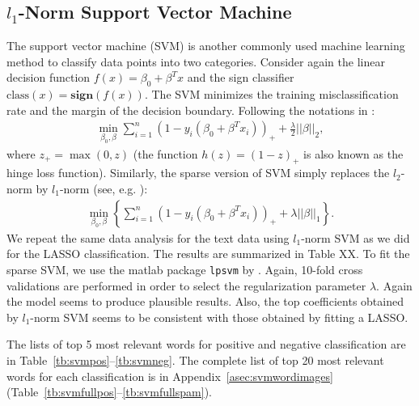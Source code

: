 \documentclass[11pt]{article}
\newcommand{\note}[1]{{\em \color{red} #1}}
\newcommand{\1}[1]{{\mathbf 1}\left\{#1\right\}}        %
\begin{document}
\subsection{$l_1$-Norm Support Vector Machine}

The support vector machine (SVM) is another commonly used machine learning method to classify data points into two categories. Consider again the linear decision function $f(x) = \beta_0 + \beta^T x$ and the sign classifier $\text{class}(x) = \textbf{sign} (f(x))$. The SVM minimizes the training misclassification rate and the margin of the decision boundary. Following the notations in \cite{hastie2004entire}:
\begin{align}
\label{eq:l2svm}
\min_{\beta_0,\beta} \sum_{i=1}^n(1-y_i(\beta_0+\beta^Tx_i))_+ + \frac{\lambda}{2} ||\beta||_2,
\end{align}
where $z_+ = \max(0,z)$ (the function $h(z) = (1-z)_+$ is also known as the hinge loss function). Similarly, the sparse version of SVM simply replaces the $l_2$-norm by $l_1$-norm (see, e.g. \cite{zhu20041}):
\begin{align*}
\label{eq:l1svm}
\min_{\beta_0,\beta} \left\{ \sum_{i=1}^n(1-y_i(\beta_0+\beta^Tx_i))_+ + \lambda ||\beta||_1\right\}. 
\end{align*}
We repeat the same data analysis for the text data using $l_1$-norm SVM as we did for the LASSO classification. The results are summarized in Table XX. To fit the sparse SVM, we use the matlab package {\tt lpsvm} by \cite{fung2004feature}. Again, 10-fold cross validations are performed in order to select the regularization parameter $\lambda$. Again the model seems to produce plausible results. Also, the top coefficients obtained by $l_1$-norm SVM seems to be consistent with those obtained by fitting a LASSO.  
%

The lists of top 5 most relevant words for positive and negative classification are in Table~\ref{tb:svmpos}--\ref{tb:svmneg}.
The complete list of top 20 most relevant words for each classification is in Appendix~\ref{asec:svmwordimages} (Table~\ref{tb:svmfullpos}--\ref{tb:svmfullspam}).
\end{document}
